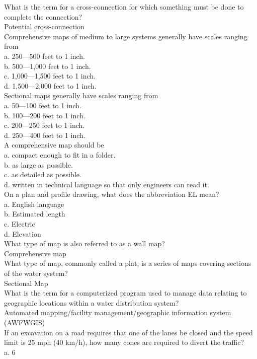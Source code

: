 What is the term for a cross-connection for which something must be done to complete the connection?\\
Potential cross-connection\\
Comprehensive maps of medium to large systems generally have scales ranging from\\
a.	250—500 feet to 1 inch.\\
b.	500—1,000 feet to 1 inch.\\
c.	1,000—1,500 feet to 1 inch.\\
d.	1,500—2,000 feet to 1 inch.\\
Sectional maps generally have scales ranging from\\
a.	50—100 feet to 1 inch.\\
b.	100—200 feet to 1 inch.\\
c.	200—250 feet to 1 inch.\\
d.	250—400 feet to 1 inch.\\
A comprehensive map should be\\
a.	compact enough to fit in a folder.\\
b.	as large as possible.\\
c.	as detailed as possible.\\
d.	written in technical language so that only engineers can read it.\\
On a plan and profile drawing, what does the abbreviation EL mean?\\
a.	English language\\
b.	Estimated length\\
c.	Electric\\
d.	Elevation\\
What type of map is also referred to as a wall map?\\
Comprehensive map\\
What type of map, commonly called a plat, is a series of maps covering sections of the water system?\\
Sectional Map\\
What is the term for a computerized program used to manage data relating to geographic locations within a water distribution system?\\
Automated mapping/facility management/geographic information system (AWFWGIS)\\
If an excavation on a road requires that one of the lanes be closed and the speed limit is 25 mph (40 km/h), how many cones are required to divert the traffic?\\
a.	6\\
